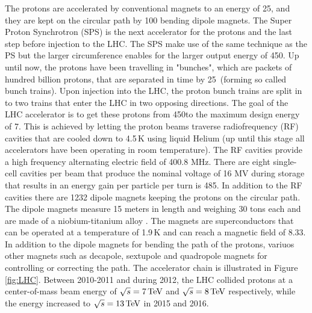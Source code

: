 The protons are accelerated by conventional magnets to an energy of 25\GeV, and they are kept on the circular path by 100 bending dipole magnets.
The Super Proton Synchrotron (SPS) is the next accelerator for the protons and the last step before injection to the LHC. 
The SPS make use of the same technique as the PS but the larger circumference enables for the larger output energy of 450\GeV.
Up until now, the protons have been travelling in "bunches", which are packets of hundred billion protons, that are separated in time by 25\ns\ (forming so called bunch trains). 
Upon injection into the LHC, the proton bunch trains are split in to two trains that enter the LHC in two opposing directions. 
The goal of the LHC accelerator is to get these protons from 450\GeV to the maximum design energy of 7\TeV. 
This is achieved by letting the proton beams traverse radiofrequency (RF) cavities that are cooled down to 4.5$\,$K using liquid Helium (up until this stage all accelerators have been operating in room temperature). 
The RF cavities provide a high frequency alternating electric field of 400.8 MHz.
There are eight single-cell cavities per beam that produce the nominal voltage of 16 MV during storage that results in an energy gain per particle per turn is 485\keV.   
In addition to the RF cavities there are 1232 dipole magnets keeping the protons on the circular path. 
The dipole magnets measure 15 meters in length and weighing 30 tons each and are made of a niobium-titanium alloy \cite{Boussard:1999rf}. 
The magnets are superconductors that can be operated at a temperature of 1.9$\,$K and can reach a magnetic field of 8.33\T. 
In addition to the dipole magnets for bending the path of the protons, variuos other magnets such as decapole, sextupole and quadropole magnets for controlling or correcting the path.      
The accelerator chain is illustrated in Figure \ref{fig:LHC}. 
Between 2010-2011 and during 2012, the LHC collided protons at a center-of-mass beam energy of $\sqrt{s}=7\,\text{Te\hspace{-.08em}V}$ and $\sqrt{s}=8\,\text{Te\hspace{-.08em}V}$ respectively, while the energy increased to $\sqrt{s}=13\,\text{Te\hspace{-.08em}V}$ in 2015 and 2016. 
